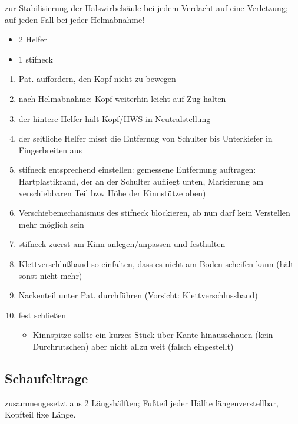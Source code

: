 zur Stabilisierung der Halswirbels\"aule bei jedem Verdacht auf eine
Verletzung; auf jeden Fall bei jeder Helmabnahme!


\begin{itemize}
    \item 2 Helfer
    \item 1 stifneck
\end{itemize}


\begin{enumerate}
    \item Pat. auffordern, den Kopf nicht zu bewegen
    \item nach Helmabnahme: Kopf weiterhin leicht auf Zug halten
    \item der hintere Helfer h\"alt Kopf/HWS in Neutralstellung
    \item der seitliche Helfer misst die Entfernug von Schulter bis
    Unterkiefer in Fingerbreiten aus
    \item stifneck entsprechend einstellen: gemessene Entfernung auftragen:
    Hartplastikrand, der an der Schulter aufliegt unten, Markierung am
    verschiebbaren Teil bzw H\"ohe der Kinnst\"utze oben)
    \item Verschiebemechanismus des stifneck blockieren, ab nun darf kein
    Verstellen mehr m\"oglich  sein
    \item stifneck zuerst am Kinn anlegen/anpassen und festhalten
    \item Klettverschlu{\ss}band so einfalten, dass es nicht am Boden
    scheifen kann (h\"alt sonst nicht mehr)
    \item Nackenteil unter Pat. durchf\"uhren (Vorsicht:
    Klettverschlussband)
    \item fest schlie{\ss}en
    \begin{itemize}
        \item[] Kinnspitze sollte ein kurzes St\"uck \"uber Kante hinausschauen
        (kein Durchrutschen) aber nicht allzu weit (falsch eingestellt)
    \end{itemize}
\end{enumerate}



\subsection{Schaufeltrage}

zusammengesetzt aus 2 L\"angsh\"alften; Fu{\ss}teil jeder H\"alfte
l\"angenverstellbar, Kopfteil fixe L\"ange.

